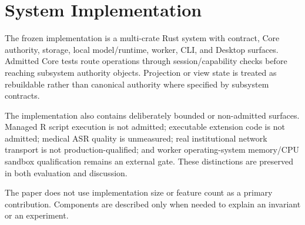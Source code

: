 \section{System Implementation}

The frozen implementation is a multi-crate Rust system with contract, Core authority, storage, local model/runtime, worker, CLI, and Desktop surfaces. Admitted Core tests route operations through session/capability checks before reaching subsystem authority objects. Projection or view state is treated as rebuildable rather than canonical authority where specified by subsystem contracts.

The implementation also contains deliberately bounded or non-admitted surfaces. Managed R script execution is not admitted; executable extension code is not admitted; medical ASR quality is unmeasured; real institutional network transport is not production-qualified; and worker operating-system memory/CPU sandbox qualification remains an external gate. These distinctions are preserved in both evaluation and discussion.

The paper does not use implementation size or feature count as a primary contribution. Components are described only when needed to explain an invariant or an experiment.
